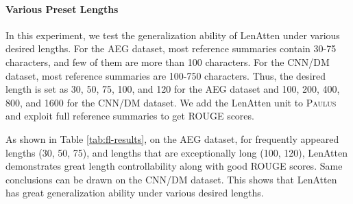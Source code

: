 \documentclass[11pt,a4paper]{article}
\begin{document}


\paragraph{Various Preset Lengths}
\label{sec:experiment-fixedlength}

In this experiment, we test the generalization ability of LenAtten under various desired lengths. For the AEG dataset, most reference summaries contain 30-75 characters, and few of them are more than 100 characters. For the CNN/DM dataset, most reference summaries are 100-750 characters. Thus, the desired length is set as 30, 50, 75, 100, and 120 for the AEG dataset and 100, 200, 400, 800, and 1600 for the CNN/DM dataset. We add the LenAtten unit to \textsc{Paulus} and exploit full reference summaries to get ROUGE scores.

As shown in Table \ref{tab:fl-results}, on the AEG dataset, for frequently appeared lengths (30, 50, 75), and lengths that are exceptionally long (100, 120), LenAtten demonstrates great length controllability along with good ROUGE scores. Same conclusions can be drawn on the CNN/DM dataset.
This shows that LenAtten has great generalization ability under various desired lengths.
\end{document}
